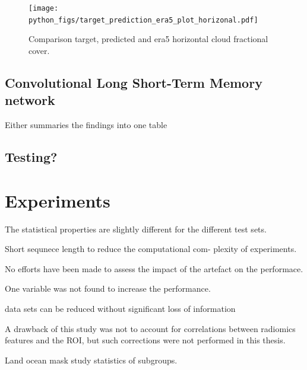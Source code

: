 \begin{figure}[ht]
    \centering
    \texttt{[image: python\_figs/target\_prediction\_era5\_plot\_horizonal.pdf]}
    \caption{Comparison target, predicted and era5 horizontal cloud fractional cover.}
    \label{fig:target_predict_era5_vertical}
\end{figure}

\subsection{Convolutional Long Short-Term Memory network}
Either summaries the findings into one table 


\subsection{Testing?}

\section{Experiments}



The statistical properties are slightly different for the different test sets.  

Short sequnece length to reduce the computational com-
plexity of experiments. 

No efforts have been made to assess the impact of the artefact on the performace.

One variable was not found to increase the performance.


data sets can be reduced without significant loss of information

A drawback of this study was not to account for correlations between radiomics features and the ROI, but such corrections were
not performed in this thesis.

Land ocean mask study statistics of subgroups.


